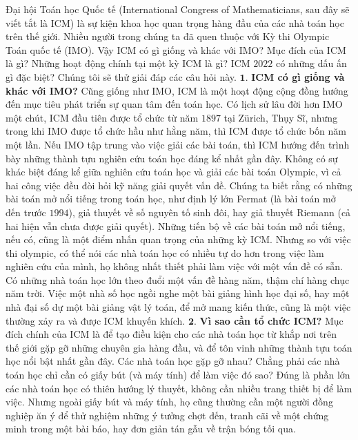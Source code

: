 \vspace*{185pt}


\begin{multicols}{2}	
	Đại hội Toán học Quốc tế (International Congress of Mathematicians, sau đây sẽ viết tắt là ICM) là sự kiện khoa học quan trọng hàng đầu của các nhà toán học trên thế giới. Nhiều người trong chúng ta đã quen thuộc với Kỳ thi Olympic Toán quốc tế (IMO). Vậy ICM có gì giống và khác với IMO? Mục đích của ICM là gì? Những hoạt động chính tại một kỳ ICM là gì? ICM $2022$ có những dấu ấn gì đặc biệt? Chúng tôi sẽ thử giải đáp các câu hỏi này.
	\vskip 0.1cm
	$\pmb{1.}$ \textbf{\color{doisongtoanhoc}ICM có gì giống và khác với IMO?}
	\vskip 0.1cm
	Cũng giống như IMO, ICM là một hoạt động cộng đồng hướng đến mục tiêu phát triển sự quan tâm đến toán học. Có lịch sử lâu đời hơn IMO một chút, ICM đầu tiên được tổ chức từ năm $1897$ tại Z\"urich, Thụy Sĩ, nhưng trong khi IMO được tổ chức hầu như hằng năm, thì ICM được tổ chức bốn năm một lần. Nếu IMO tập trung vào việc giải các bài toán, thì ICM hướng đến trình bày những thành tựu nghiên cứu toán học đáng kể nhất gần đây. Không có sự khác biệt đáng kể giữa nghiên cứu toán học và giải các bài toán Olympic, vì cả hai công việc đều đòi hỏi kỹ năng giải quyết vấn đề. Chúng ta biết rằng có những bài toán mở nổi tiếng trong toán học, như  định lý lớn Fermat (là bài toán mở đến trước $1994$), giả thuyết về số nguyên tố sinh đôi, hay giả thuyết Riemann (cả hai hiện vẫn chưa được giải quyết). Những tiến bộ về các bài toán mở nổi tiếng, nếu có, cũng là một điểm nhấn quan trọng của những kỳ ICM. Nhưng so với việc thi olympic, có thể nói các nhà toán học có nhiều tự do hơn trong việc làm nghiên cứu của mình, họ không nhất thiết phải làm việc với một vấn đề có sẵn. Có những nhà toán học lớn theo đuổi một vấn đề  hàng năm, thậm chí hàng chục năm trời. Việc một nhà số học ngồi nghe một bài giảng hình học đại số, hay một nhà đại số dự một bài giảng vật lý toán, để mở mang kiến thức, cũng là một việc thường xảy ra và được ICM khuyến khích.
	\vskip 0.1cm
	$\pmb{2.}$ \textbf{\color{doisongtoanhoc}Vì sao cần tổ chức ICM?}
	\vskip 0.1cm
	Mục đích chính của ICM là để tạo điều kiện cho các nhà toán học từ khắp nơi trên thế giới gặp gỡ những chuyên gia hàng đầu, và để tôn vinh những thành tựu toán học nổi bật nhất gần đây.
	\vskip 0.1cm
	Các nhà toán học gặp gỡ nhau? Chẳng phải các nhà toán học chỉ cần có giấy bút (và máy tính) để làm việc đó sao? Đúng là phần lớn các nhà toán học  có thiên hướng lý thuyết,  không cần nhiều trang thiết bị để làm việc. Nhưng ngoài giấy bút và máy tính, họ cũng thường cần một người đồng nghiệp ăn ý để thử nghiệm những ý tưởng chợt đến, tranh cãi về một chứng minh trong một bài báo, hay đơn giản tán gẫu về trận bóng tối qua. 

\end{multicols}

